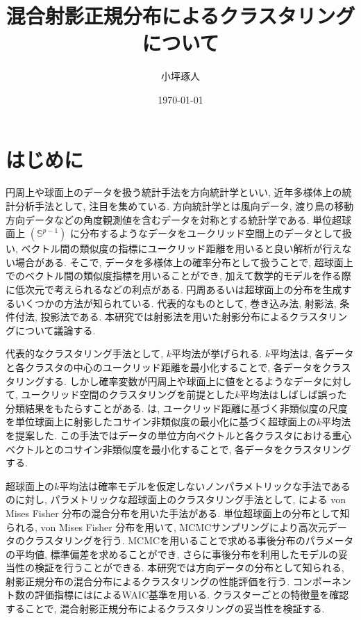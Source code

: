 \documentclass[a4j,12pt]{jarticle}
\title{混合射影正規分布によるクラスタリングについて}   %
\author{小坪琢人}   %
\date{\today}   %
\begin{document}


\setlength{\baselineskip}{20pt}   %
\tableofcontents   %
\listoffigures   %
\listoftables   %
\clearpage   %


\section{はじめに}

円周上や球面上のデータを扱う統計手法を方向統計学といい, 近年多様体上の統計分析手法として, 注目を集めている. 方向統計学とは風向データ, 渡り鳥の移動方向データなどの角度観測値を含むデータを対称とする統計学である. 単位超球面上 $(\mathbb{S}^{p-1})$ に分布するようなデータをユークリッド空間上のデータとして扱い, ベクトル間の類似度の指標にユークリッド距離を用いると良い解析が行えない場合がある. そこで, データを多様体上の確率分布として扱うことで, 超球面上でのベクトル間の類似度指標を用いることができ, 加えて数学的モデルを作る際に低次元で考えられるなどの利点がある. 円周あるいは超球面上の分布を生成するいくつかの方法が知られている. 代表的なものとして, 巻き込み法, 射影法, 条件付法, 投影法である. 本研究では射影法を用いた射影分布によるクラスタリングについて議論する.

代表的なクラスタリング手法として, $k$平均法が挙げられる. $k$平均法は, 各データと各クラスタの中心のユークリッド距離を最小化することで, 各データをクラスタリングする. しかし確率変数が円周上や球面上に値をとるようなデータに対して, ユークリッド空間のクラスタリングを前提とした$k$平均法はしばしば誤った分類結果をもたらすことがある. \citet{SKMcluster}は, ユークリッド距離に基づく非類似度の尺度を単位球面上に射影したコサイン非類似度の最小化に基づく超球面上の$k$平均法を提案した. この手法ではデータの単位方向ベクトルと各クラスタにおける重心ベクトルとのコサイン非類似度を最小化することで, 各データをクラスタリングする. 

超球面上の$k$平均法は確率モデルを仮定しないノンパラメトリックな手法であるのに対し,  パラメトリックな超球面上のクラスタリング手法として, \citet{Gopal}による von Mises Fisher 分布の混合分布を用いた手法がある. 単位超球面上の分布として知られる, von Mises Fisher 分布を用いて, MCMCサンプリングにより高次元データのクラスタリングを行う. MCMCを用いることで求める事後分布のパラメータの平均値, 標準偏差を求めることができ, さらに事後分布を利用したモデルの妥当性の検証を行うことができる. 本研究では方向データの分布として知られる, 射影正規分布の混合分布によるクラスタリングの性能評価を行う. コンポーネント数の評価指標には\citet{WAIC}によるWAIC基準を用いる. クラスターごとの特徴量を確認することで, 混合射影正規分布によるクラスタリングの妥当性を検証する.
\end{document}
